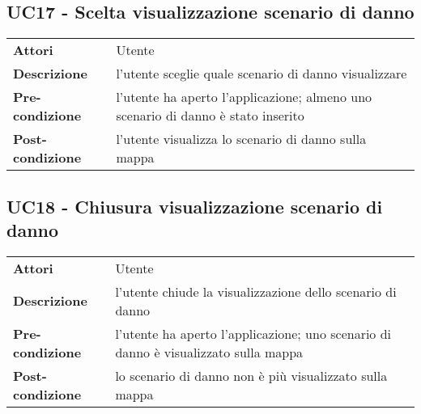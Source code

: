 \subsection{UC17 - Scelta visualizzazione scenario di danno}
\label{sssec:UC17}
\def\arraystretch{1.5}
\begin{tabularx}{\textwidth}{l|p{}}
\rowcolor{I} \multicolumn{2}{c}{\color{white}\textbf{UC17 - Scelta visualizzazione scenario di danno}} \\
\toprule
\endhead
\textbf{Attori} & Utente\\
\textbf{Descrizione} & l'utente sceglie quale scenario di danno visualizzare\\
\textbf{Pre-condizione} & l'utente ha aperto l'applicazione; almeno uno scenario di danno è stato inserito\\
\textbf{Post-condizione} & l'utente visualizza lo scenario di danno sulla mappa\\
\bottomrule
\end{tabularx}
\subsection{UC18 - Chiusura visualizzazione scenario di danno}
\label{sssec:UC18}
\def\arraystretch{1.5}
\begin{tabularx}{\textwidth}{l|p{}}
\rowcolor{I} \multicolumn{2}{c}{\color{white}\textbf{UC18 - Chiusura visualizzazione scenario di danno}} \\
\toprule
\endhead
\textbf{Attori} & Utente\\
\textbf{Descrizione} & l'utente chiude la visualizzazione dello scenario di danno\\
\textbf{Pre-condizione} & l'utente ha aperto l'applicazione; uno scenario di danno è visualizzato sulla mappa\\
\textbf{Post-condizione} & lo scenario di danno non è più visualizzato sulla mappa\\
\bottomrule
\end{tabularx}

